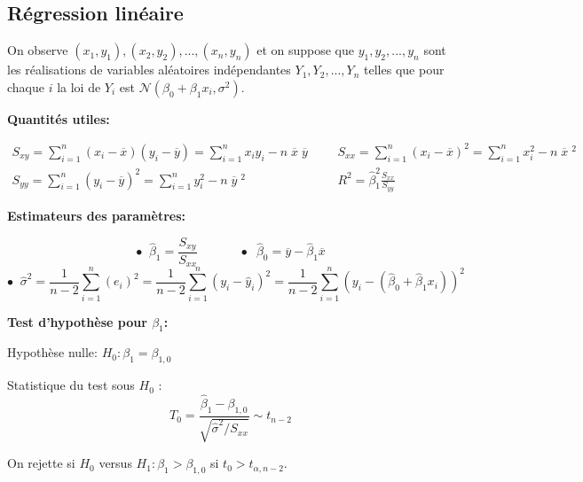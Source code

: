 \documentclass[12pt,french]{article}
\begin{document}
\subsection*{Régression linéaire}


\vspace{0.5cm}

On observe $(x_1,y_1), (x_2, y_2),..., (x_n,y_n)$ et on
suppose que $y_1, y_2,..., y_n$ sont les réalisations de
variables aléatoires indépendantes $Y_1, Y_2,..., Y_n$ telles
que pour chaque $i$ la loi de $Y_i$ est $\mathcal{N}(\beta_0 + \beta_1 x_i,
\sigma^2)$.

\vspace{0.2 in}

\textbf{Quantités utiles:} 

\vspace{-0.7 cm}
\begin{align*}
S_{xy}=\sum\limits_{i=1}^n (x_i-\overline
x)(y_i-\overline y) =  \sum\limits_{i=1}^n x_iy_i - n\;\overline
x\;\overline y & & &
S_{xx} =\sum\limits_{i=1}^n (x_i-\overline x)^2 =
\sum\limits_{i=1}^n x_i^2 - n\;\overline x\;^2\\
S_{yy} =\sum\limits_{i=1}^n (y_i-\overline y)^2 =
\sum\limits_{i=1}^n y_i^2 - n\;\overline y\;^2 & & &
R^2 = \hat{\beta}_1^2 \frac{S_{xx}}{S_{yy}}
\end{align*}

\textbf{Estimateurs des paramètres:}

$$ \bullet \; \; \hat{\beta}_1 =\frac{S_{xy}}{S_{xx}} \;\;\;\;\;\; \;\;\;\;\;\; \bullet \;\; \hat{\beta}_0 = \overline{y} - \hat{\beta}_1 \overline{x} $$
$$ \bullet \;\; \hat{\sigma}^2 = \frac{1}{n-2} \sum_{i=1}^n (e_i)^2 = \frac{1}{n-2} \sum_{i=1}^n (y_i - \hat{y}_i)^2  = \frac{1}{n-2} \sum_{i=1}^n (y_i - (\hat{\beta}_0 + \hat{\beta}_1 x_i))^2$$

\vspace{0.2in}
\textbf{Test d'hypothèse pour $\beta_1$:}
\vspace{0.1in}

Hypothèse nulle:  $H_0:  \beta_1= \beta_{1,0}$

Statistique du test sous $H_0$ : 
$$ T_0 = \frac{\hat{\beta}_1 - \beta_{1,0}}{\sqrt{\hat{\sigma}^2/S_{xx}}} \sim t_{n-2}$$

\vspace{0.05 in}
On rejette si $H_0$ versus $H_1 : \beta_1 > \beta_{1,0}$ si $t_0 > t_{\alpha, n-2}$.\\
\end{document}

